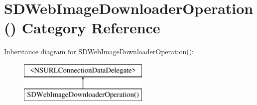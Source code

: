 \hypertarget{category_s_d_web_image_downloader_operation_07_08}{}\section{S\+D\+Web\+Image\+Downloader\+Operation() Category Reference}
\label{category_s_d_web_image_downloader_operation_07_08}
Inheritance diagram for S\+D\+Web\+Image\+Downloader\+Operation()\+:\begin{figure}[H]
\begin{center}
\leavevmode
\includegraphics[height=2.000000cm]{category_s_d_web_image_downloader_operation_07_08}
\end{center}
\end{figure}
